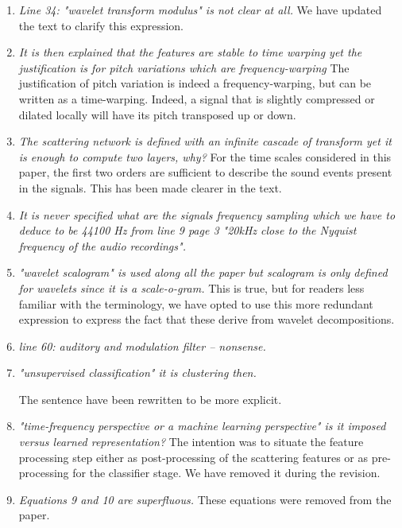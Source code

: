 \documentclass[10pt]{article}
\begin{document}
\begin{enumerate}
\item \emph{Line 34: "wavelet transform modulus" is not clear at all.}
We have updated the text to clarify this expression.

\item \emph{It is then explained that the features are stable to time warping yet the justification is for pitch variations which are frequency-warping}
The justification of pitch variation is indeed a frequency-warping, but can be written as a time-warping. Indeed, a signal that is slightly compressed or dilated locally will have its pitch transposed up or down.

\item \emph{The scattering network is defined with an infinite cascade of transform yet it is enough to compute two layers, why?}
For the time scales considered in this paper, the first two orders are sufficient to describe the sound events present in the signals. This has been made clearer in the text.

\item \emph{It is never specified what are the signals frequency sampling which we have to deduce to be 44100 Hz from line 9 page 3 "20kHz close to the Nyquist frequency of the audio recordings".}

\item \emph{"wavelet scalogram" is used along all the paper but scalogram is only defined for wavelets since 
it is a scale-o-gram.}
This is true, but for readers less familiar with the terminology, we have opted to use this more redundant expression to express the fact that these derive from wavelet decompositions.

\item \emph{line 60: auditory and modulation filter – nonsense.}

\item \emph{"unsupervised classification" it is clustering then.}

The sentence have been rewritten to be more explicit.

\item \emph{"time-frequency perspective or a machine learning perspective" is it imposed versus learned representation? }
The intention was to situate the feature processing step either as post-processing of the scattering features or as pre-processing for the classifier stage. We have removed it during the revision.

\item \emph{Equations 9 and 10 are superfluous.}
These equations were removed from the paper.

\end{enumerate}
\end{document}
